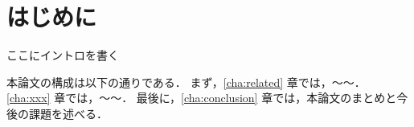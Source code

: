 \chapter{はじめに}
\label{cha:intro}

ここにイントロを書く

本論文の構成は以下の通りである．
まず，\ref{cha:related} 章では，～～．
\ref{cha:xxx} 章では，～～．
最後に，\ref{cha:conclusion} 章では，本論文のまとめと今後の課題を述べる．